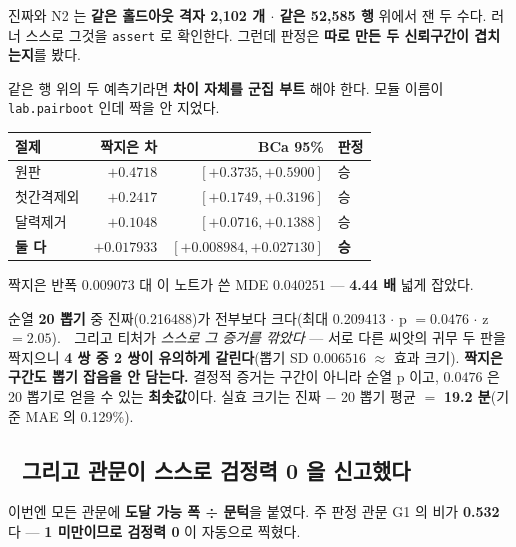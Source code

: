 \documentclass{article}
\begin{document}
진짜와 N2 는 \textbf{같은 홀드아웃 격자 2{,}102 개 $\cdot$ 같은 52{,}585 행} 위에서 잰 두 수다.
러너 스스로 그것을 \texttt{assert} 로 확인한다. 그런데 판정은
\textbf{따로 만든 두 신뢰구간이 겹치는지}를 봤다.

{같은 행 위의 두 예측기라면 \textbf{차이 자체를 군집 부트} 해야 한다.
모듈 이름이 \texttt{lab.pairboot} 인데 짝을 안 지었다.}

\begin{table}[h]\centering\small
\begin{tabular}{lrrl}
\toprule
절제 & 짝지은 차 & BCa 95\% & 판정 \\
\midrule
원판 & $+0.4718$ & $[+0.3735, +0.5900]$ & 승 \\
첫간격제외 & $+0.2417$ & $[+0.1749, +0.3196]$ & 승 \\
달력제거 & $+0.1048$ & $[+0.0716, +0.1388]$ & 승 \\
\textbf{둘 다} & $\mathbf{+0.017933}$ & $\mathbf{[+0.008984, +0.027130]}$ & \textbf{승} \\
\bottomrule
\end{tabular}
\end{table}

{짝지은 반폭 $0.009073$ 대 이 노트가 쓴 MDE $0.040251$ --- \textbf{4.44 배} 넓게 잡았다.}

{순열 \textbf{20 뽑기} 중 진짜(0.216488)가 전부보다 크다(최대 0.209413 $\cdot$ p $=0.0476$ $\cdot$ z $=2.05$).
🔴 그리고 티처가 \emph{스스로 그 증거를 깎았다} --- 서로 다른 씨앗의 귀무 두 판을 짝지으니
\textbf{4 쌍 중 2 쌍이 유의하게 갈린다}(뽑기 SD $0.006516$ $\approx$ 효과 크기).
\textbf{짝지은 구간도 뽑기 잡음을 안 담는다.}
결정적 증거는 구간이 아니라 순열 p 이고, $0.0476$ 은 20 뽑기로 얻을 수 있는 \textbf{최솟값}이다.}
실효 크기는 진짜 $-$ 20 뽑기 평균 $=$ \textbf{19.2 분}(기준 MAE 의 0.129\%).

\subsection{🔴 그리고 관문이 스스로 검정력 0 을 신고했다}

이번엔 모든 관문에 \textbf{도달 가능 폭 ÷ 문턱}을 붙였다.
주 판정 관문 G1 의 비가 \textbf{0.532}다 --- \textbf{1 미만이므로 검정력 0} 이 자동으로 찍혔다.
\end{document}
